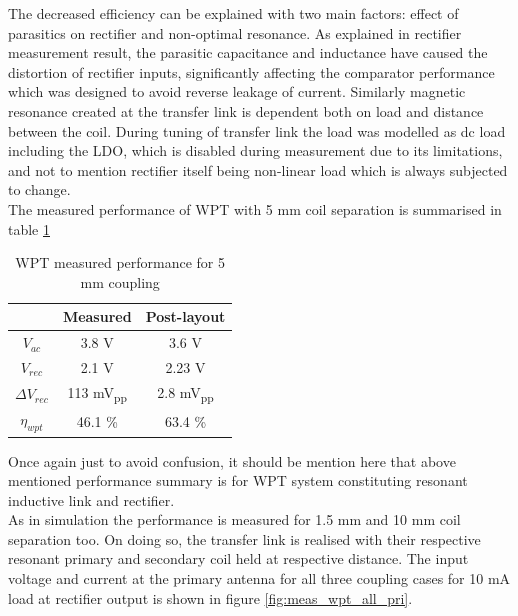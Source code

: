 \documentclass[12pt,a4paper,UKenglish]{report}
\begin{document}
  The decreased efficiency can be explained with two main factors: effect of parasitics on rectifier and non-optimal resonance. As explained in rectifier measurement result, the parasitic capacitance and inductance have caused the distortion of rectifier inputs, significantly affecting the comparator performance which was designed to avoid reverse leakage of current. Similarly magnetic resonance created at the transfer link is dependent both on load and distance between the coil. During tuning of transfer link the load was modelled as dc load including the LDO, which is disabled during measurement due to its limitations, and not to mention rectifier itself being non-linear load which is always subjected to change. \\
  
  The measured performance of WPT with 5 mm coil separation is summarised in table \ref{tab:wpt_spec_meas}
  
\begin{table}[H]
\caption{WPT measured performance  for 5 mm coupling} 
\begin{center}
\begin{tabular}{c|c|c}
\hline \hline
				& \textbf{Measured}				& \textbf{Post-layout} 	\\\hline \hline
$V_{ac}$			& 3.8 \si{\volt}					& 3.6 \si{\volt} \\ \hline
$V_{rec}$ 			& 2.1 \si{\volt}					& 2.23 V	\\ \hline
$\Delta V_{rec}$	& 113 \si{\milli\volt}\textsubscript{pp} 	& 2.8 \si{\milli\volt}\textsubscript{pp}		\\ \hline
$\eta_{wpt}$		& 46.1 \%						& 63.4 \%		\\ 
  
\hline \hline
\end{tabular}
\end{center}
\label{tab:wpt_spec_meas}
\end{table}%


 Once again just to avoid confusion, it should be mention here that above mentioned performance summary is for WPT system constituting resonant inductive link and rectifier. \\
 
 As in simulation the performance is measured for 1.5 mm and 10 mm coil separation too. On doing so, the transfer link is realised with their respective resonant primary and secondary coil held at respective distance. The input voltage and current at the primary antenna for all three coupling cases for 10 mA load at rectifier output is shown in figure \ref{fig:meas_wpt_all_pri}. \\
 
\end{document}

